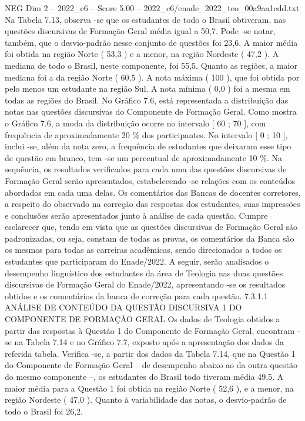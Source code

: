 \begin{textsample}{NEG Dim 2 – 2022\_c6 – Score 5.00 – 2022\_c6/enade\_2022\_teo\_00a9aa1edd.txt}
Na Tabela 7.13, observa -se que os estudantes de todo o Brasil obtiveram, nas questões discursivas de Formação Geral média igual a 50,7.
Pode -se notar, também, que o desvio-padrão nesse conjunto de questões foi 23,6.
A maior média foi obtida na região Norte ( 53,3 ) e a menor, na região Nordeste ( 47,2 ).
A mediana de todo o Brasil, neste componente, foi 55,5.
Quanto as regiões, a maior mediana foi a da região Norte ( 60,5 ).
A nota máxima ( 100 ), que foi obtida por pelo menos um estudante na região Sul.
A nota mínima ( 0,0 ) foi a mesma em todas as regiões do Brasil.
No Gráfico 7.6, está representada a distribuição das notas nas questões discursivas do Componente de Formação Geral.
Como mostra o Gráfico 7.6, a moda da distribuição ocorre no intervalo [ 60 ; 70 ], com frequência de aproximadamente 20 \% dos participantes.
No intervalo [ 0 ; 10 ], inclui -se, além da nota zero, a frequência de estudantes que deixaram esse tipo de questão em branco, tem -se um percentual de aproximadamente 10 \%.
Na sequência, os resultados verificados para cada uma das questões discursivas de Formação Geral serão apresentados, estabelecendo -se relações com os conteúdos abordados em cada uma delas.
Os comentários das Bancas de docentes corretores, a respeito do observado na correção das respostas dos estudantes, suas impressões e conclusões serão apresentados junto à análise de cada questão.
Cumpre esclarecer que, tendo em vista que as questões discursivas de Formação Geral são padronizadas, ou seja, constam de todas as provas, os comentários da Banca são os mesmos para todas as carreiras acadêmicas, sendo direcionados a todos os estudantes que participaram do Enade/2022.
A seguir, serão analisados o desempenho linguístico dos estudantes da área de Teologia nas duas questões discursivas de Formação Geral do Enade/2022, apresentando -se os resultados obtidos e os comentários da banca de correção para cada questão. 7.3.1.1 ANÁLISE DE CONTEÚDO DA QUESTÃO DISCURSIVA 1 DO COMPONENTE DE FORMAÇÃO GERAL Os dados de Teologia obtidos a partir das respostas à Questão 1 do Componente de Formação Geral, encontram -se na Tabela 7.14 e no Gráfico 7.7, exposto após a apresentação dos dados da referida tabela.
Verifica -se, a partir dos dados da Tabela 7.14, que na Questão 1 do Componente de Formação Geral – de desempenho abaixo ao da outra questão do mesmo componente –, os estudantes do Brasil todo tiveram média 49,5.
A maior média para a Questão 1 foi obtida na região Norte ( 52,6 ), e a menor, na região Nordeste ( 47,0 ).
Quanto à variabilidade das notas, o desvio-padrão de todo o Brasil foi 26,2.

\end{textsample}
